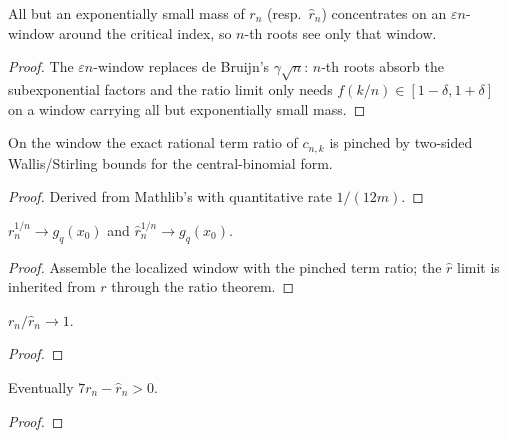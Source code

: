 \begin{lemma}
  \label{lem:localize}
  \leanok
  All but an exponentially small mass of $r_n$ (resp.\ $\hat r_n$) concentrates
  on an $\varepsilon n$-window around the critical index, so $n$-th roots see
  only that window.
\end{lemma}
\begin{proof}\leanok{}
  The $\varepsilon n$-window replaces de Bruijn's $\gamma\sqrt n$: $n$-th roots
  absorb the subexponential factors and the ratio limit only needs
  $f(k/n)\in[1-\delta,1+\delta]$ on a window carrying all but exponentially
  small mass.
\end{proof}

\begin{lemma}
  \label{lem:window}
  \leanok
  On the window the exact rational term ratio of $c_{n,k}$ is pinched by
  two-sided Wallis/Stirling bounds for the central-binomial form.
\end{lemma}
\begin{proof}\leanok{}
  Derived from Mathlib's  with quantitative rate $1/(12m)$.
\end{proof}

\begin{lemma}
  \label{lem:root_r}
  \leanok
  $r_n^{1/n}\to g_q(x_0)$ and $\hat r_n^{1/n}\to g_q(x_0)$.
\end{lemma}
\begin{proof}\leanok{}
  Assemble the localized window with the pinched term ratio; the $\hat r$
  limit is inherited from $r$ through the ratio theorem.
\end{proof}

\begin{lemma}[Ratio $\to 1$]
  \label{lem:ratio}
  \leanok
  $r_n/\hat r_n\to1$.
\end{lemma}
\begin{proof}\leanok{}\end{proof}

\begin{lemma}
  \label{lem:pos}
  \leanok
  Eventually $7r_n-\hat r_n>0$.
\end{lemma}
\begin{proof}\leanok{}\end{proof}

